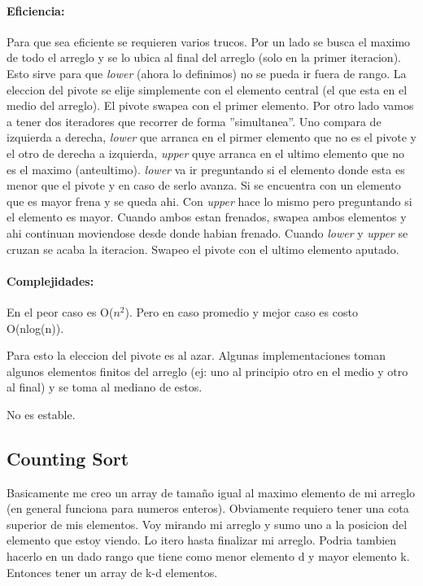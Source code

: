 \documentclass[11pt]{article}
\begin{document}
\paragraph{Eficiencia:}
Para que sea eficiente se requieren varios trucos.
Por un lado se busca el maximo de todo el arreglo y se lo ubica
al final del arreglo (solo en la primer iteracion).
Esto sirve para que \textit{lower} (ahora lo definimos) no se pueda ir fuera de rango.
La eleccion del pivote se elije simplemente con el elemento central
(el que esta en el medio del arreglo).
El pivote swapea con el primer elemento.
Por otro lado vamos a tener dos iteradores que recorrer de forma ''simultanea''.
Uno compara de izquierda a derecha, \textit{lower} que arranca
en el pirmer elemento que no es el pivote y el otro de derecha a izquierda,
\textit{upper} quye arranca en el ultimo elemento que no es el maximo (anteultimo).
\textit{lower} va ir preguntando si el elemento donde esta es menor que
el pivote y en caso de serlo avanza.
Si se encuentra con un elemento que es mayor frena y se queda ahi.
Con \textit{upper} hace lo mismo pero preguntando si el elemento es mayor.
Cuando ambos estan frenados, swapea ambos elementos y ahi continuan
moviendose desde donde habian frenado.
Cuando \textit{lower} y  \textit{upper} se cruzan se acaba la iteracion.
Swapeo el pivote con el ultimo elemento aputado.


\paragraph{Complejidades:}
En el peor caso es O($n^2$). Pero en caso promedio y mejor caso
es costo O(nlog(n)).

Para esto la eleccion del pivote es al azar.
Algunas implementaciones toman algunos elementos finitos del arreglo
(ej: uno al principio otro en el medio y otro al final) y se toma
al mediano de estos.

No es estable.

\subsection{Counting Sort}
Basicamente me creo un array de tama\~no igual al maximo elemento de mi
arreglo (en general funciona para numeros enteros).
Obviamente requiero tener una cota superior de mis elementos.
Voy mirando mi arreglo y sumo uno a la posicion del elemento que estoy viendo.
Lo itero hasta finalizar mi arreglo.
Podria tambien hacerlo en un dado rango que tiene como menor elemento d y
mayor elemento k.
Entonces tener un array de k-d elementos.
\end{document}
